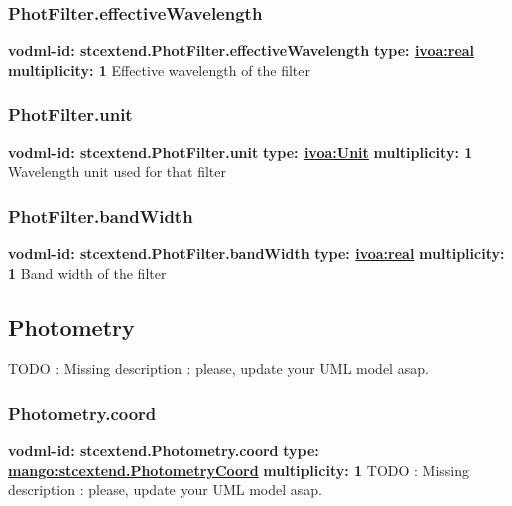     \subsubsection{PhotFilter.effectiveWavelength}
      \textbf{vodml-id: stcextend.PhotFilter.effectiveWavelength} \newline
      \textbf{type: \hyperref[sect:ivoa]{ivoa:real}} \newline
      \textbf{multiplicity: 1} \newline 
      Effective wavelength of the filter

    \subsubsection{PhotFilter.unit}
      \textbf{vodml-id: stcextend.PhotFilter.unit} \newline
      \textbf{type: \hyperref[sect:ivoa]{ivoa:Unit}} \newline
      \textbf{multiplicity: 1} \newline 
      Wavelength unit used for that filter

    \subsubsection{PhotFilter.bandWidth}
      \textbf{vodml-id: stcextend.PhotFilter.bandWidth} \newline
      \textbf{type: \hyperref[sect:ivoa]{ivoa:real}} \newline
      \textbf{multiplicity: 1} \newline 
      Band width of the filter

  \subsection{Photometry}
  \label{sect:stcextend.Photometry}
    TODO : Missing description : please, update your UML model asap.

    \subsubsection{Photometry.coord}
      \textbf{vodml-id: stcextend.Photometry.coord} \newline
      \textbf{type: \hyperref[sect:stcextend.PhotometryCoord]{mango:stcextend.PhotometryCoord}} \newline
      \textbf{multiplicity: 1} \newline 
      TODO : Missing description : please, update your UML model asap.

